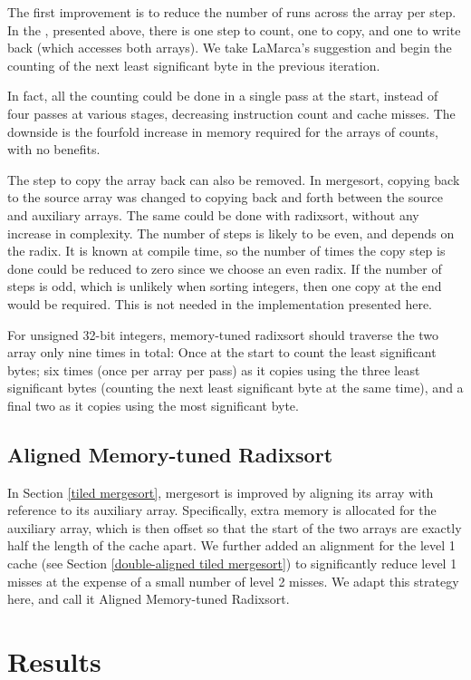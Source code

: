 The first improvement is to reduce the number of runs across the array per
step.  In the , presented above, there is one step to count,
one to copy, and one to write back (which accesses both arrays). We take
LaMarca's suggestion and begin the counting of the next least significant byte
in the previous iteration.

In fact, all the counting could be done in a single pass at the start, instead
of four passes at various stages, decreasing instruction count and cache misses.
The downside is the fourfold increase in memory required for the arrays of
counts, with no benefits.

The step to copy the array back can also be removed. In mergesort, copying back
to the source array was changed to copying back and forth between the source and
auxiliary arrays. The same could be done with radixsort, without any increase in
complexity. The number of steps is likely to be even, and depends on the radix.
It is known at compile time, so the number of times the copy step is done could
be reduced to zero since we choose an even radix. If the number of steps is odd,
which is unlikely when sorting integers, then one copy at the end would be
required. This is not needed in the implementation presented here.

For unsigned 32-bit integers, memory-tuned radixsort should traverse the two
array only nine times in total: Once at the start to count the least significant
bytes; six times (once per array per pass) as it copies using the three least
significant bytes (counting the next least significant byte at the same time),
and a final two as it copies using the most significant byte.


\subsection{Aligned Memory-tuned Radixsort}
In Section \ref{tiled mergesort}, mergesort is improved by aligning its array
with reference to its auxiliary array. Specifically, extra memory is allocated
for the auxiliary array, which is then offset so that the start of the two
arrays are exactly half the length of the cache apart. We further added an
alignment for the level 1 cache (see Section \ref{double-aligned tiled
mergesort}) to significantly reduce level 1 misses at the expense of a small
number of level 2 misses. We adapt this strategy here, and call it Aligned
Memory-tuned Radixsort.


\section{Results}
